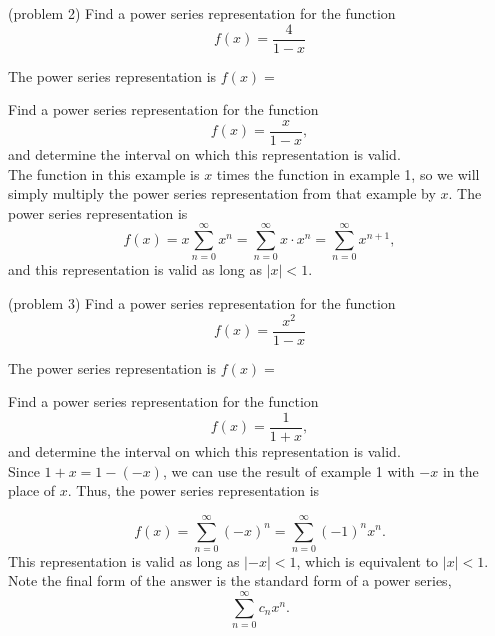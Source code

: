\documentclass[handout]{ximera}
\begin{document}
\begin{problem}(problem 2)
Find a power series representation for the function
\[
f(x) = \frac{4}{1-x}
\]

The power series representation is $f(x) = $
\begin{multipleChoice}
\end{multipleChoice}
\end{problem}


\begin{example}[example 3]
Find a power series representation for the function
\[
f(x) = \frac{x}{1-x},
\]
and determine the interval on which this representation is valid.\\
The function in this example is $x$ times the function in example 1, 
so we will simply multiply the power series representation from that example by $x$.
The power series representation is
\[
f(x) = x\sum_{n=0}^\infty x^n  = \sum_{n=0}^\infty x\cdot x^n = \sum_{n=0}^\infty x^{n+1},
\]
and this representation is valid as long as $|x| < 1$.

\end{example}


\begin{problem}(problem 3)
Find a power series representation for the function
\[
f(x) = \frac{x^2}{1-x}
\]

The power series representation is $f(x) = $
\begin{multipleChoice}
\end{multipleChoice}
\end{problem}


\begin{example}[example 4]
Find a power series representation for the function
\[
f(x) = \frac{1}{1 + x},
\]
and determine the interval on which this representation is valid.\\
Since $1 + x = 1 - (-x)$, we can use the result of example 1 with $-x$ in the place of $x$.
Thus, the power series representation is

\[
f(x) = \sum_{n=0}^\infty (-x)^n = \sum_{n=0}^\infty (-1)^n x^n.
\]
This representation is valid as long as $|-x| < 1$, which is equivalent to $|x| < 1$.
Note the final form of the answer is the standard form of a power series,
\[
\sum_{n=0}^\infty c_nx^n.
\]

\end{example}
\end{document}
